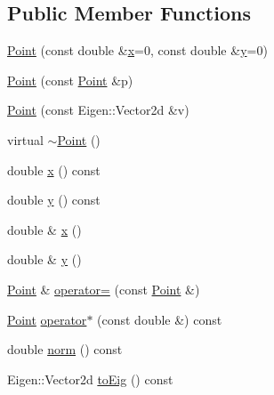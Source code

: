 \subsection*{Public Member Functions}
\begin{DoxyCompactItemize}
\item 
\hyperlink{classTspeed_1_1Geo_1_1Point_a1d341df68317135dd9f7f39a172fd2d6}{Point} (const double \&\hyperlink{classTspeed_1_1Geo_1_1Point_a658f2ac4d36ea76832a36d8a4b0bcf96}{x}=0, const double \&\hyperlink{classTspeed_1_1Geo_1_1Point_a1424ccbaba0dbed5605d99f4718774ed}{y}=0)
\item 
\hyperlink{classTspeed_1_1Geo_1_1Point_a2d4ba9608644de1238c56dd570f2891a}{Point} (const \hyperlink{classTspeed_1_1Geo_1_1Point}{Point} \&p)
\item 
\hyperlink{classTspeed_1_1Geo_1_1Point_a6a35bb9a5f7842697aae1195e6483be1}{Point} (const Eigen\-::\-Vector2d \&v)
\item 
virtual \hyperlink{classTspeed_1_1Geo_1_1Point_a473a872a53b39b9ff91d4030c5a23003}{$\sim$\-Point} ()
\item 
double \hyperlink{classTspeed_1_1Geo_1_1Point_a658f2ac4d36ea76832a36d8a4b0bcf96}{x} () const 
\item 
double \hyperlink{classTspeed_1_1Geo_1_1Point_a1424ccbaba0dbed5605d99f4718774ed}{y} () const 
\item 
double \& \hyperlink{classTspeed_1_1Geo_1_1Point_a69ed6e602a1419a1afa1eaabd8abe911}{x} ()
\item 
double \& \hyperlink{classTspeed_1_1Geo_1_1Point_a77ed4b94b0f211f9f8b9a561303f0a32}{y} ()
\item 
\hyperlink{classTspeed_1_1Geo_1_1Point}{Point} \& \hyperlink{classTspeed_1_1Geo_1_1Point_aa1ac2e8afe8a77f5e13872a8fd362351}{operator=} (const \hyperlink{classTspeed_1_1Geo_1_1Point}{Point} \&)
\item 
\hyperlink{classTspeed_1_1Geo_1_1Point}{Point} \hyperlink{classTspeed_1_1Geo_1_1Point_acd2d93ca69ef15f5567e62965c16b14b}{operator$\ast$} (const double \&) const 
\item 
double \hyperlink{classTspeed_1_1Geo_1_1Point_a38c11bbd4d5e6db5f0486e8de30e6ca9}{norm} () const 
\item 
Eigen\-::\-Vector2d \hyperlink{classTspeed_1_1Geo_1_1Point_a4a3f7bd060f187b20cc258c47bf89da9}{to\-Eig} () const 
\end{DoxyCompactItemize}
